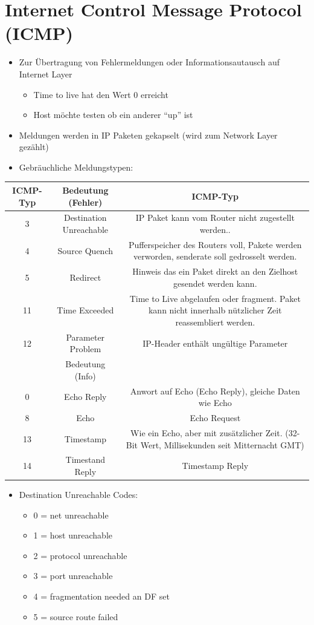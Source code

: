 
\section*{Internet Control Message Protocol (ICMP)}
\begin{itemize}
\item Zur Übertragung von Fehlermeldungen oder Informationsautausch auf
Internet Layer

\begin{itemize}
\item Time to live hat den Wert 0 erreicht
\item Host möchte testen ob ein anderer ``up'' ist
\end{itemize}
\item Meldungen werden in IP Paketen gekapselt (wird zum Network Layer gezählt)
\item Gebräuchliche Meldungstypen:
\end{itemize}
\begin{tabular}{|c|c|c|}
\hline 
ICMP-Typ & Bedeutung (Fehler) & ICMP-Typ\tabularnewline
\hline 
\hline 
3 & Destination Unreachable & IP Paket kann vom Router nicht zugestellt werden..\tabularnewline
\hline 
4 & Source Quench & Pufferspeicher des Routers voll, Pakete werden verworden, senderate
soll gedrosselt werden.\tabularnewline
\hline 
5 & Redirect & Hinweis das ein Paket direkt an den Zielhost gesendet werden kann.\tabularnewline
\hline 
11 & Time Exceeded & Time to Live abgelaufen oder fragment. Paket kann nicht innerhalb
nützlicher Zeit reassembliert werden.\tabularnewline
\hline 
12 & Parameter Problem & IP-Header enthält ungültige Parameter\tabularnewline
\hline 
 & Bedeutung (Info) & \tabularnewline
\hline 
0 & Echo Reply & Anwort auf Echo (Echo Reply), gleiche Daten wie Echo\tabularnewline
\hline 
8 & Echo & Echo Request\tabularnewline
\hline 
13 & Timestamp & Wie ein Echo, aber mit zusätzlicher Zeit. (32-Bit Wert, Millisekunden
seit Mitternacht GMT)\tabularnewline
\hline 
14 & Timestand Reply & Timestamp Reply\tabularnewline
\hline 
\end{tabular}
\begin{itemize}
\item Destination Unreachable Codes:

\begin{itemize}
\item 0 = net unreachable
\item 1 = host unreachable
\item 2 = protocol unreachable
\item 3 = port unreachable
\item 4 = fragmentation needed an DF set
\item 5 = source route failed
\end{itemize}
\end{itemize}

